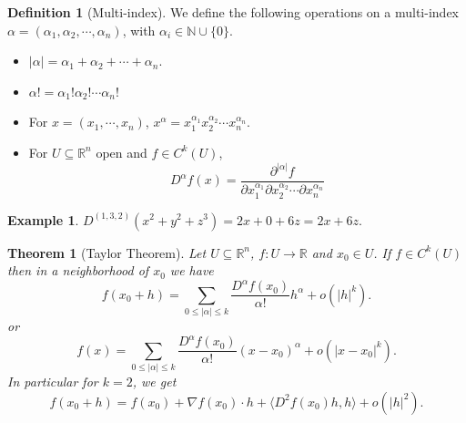 \documentclass[11pt,openany]{book}
\theoremstyle{plain}
\newtheorem{theorem}{Theorem}[chapter]
\theoremstyle{definition}
\newtheorem{definition}{Definition}[chapter]
\newtheorem{example}{Example}[chapter]
\theoremstyle{remark}
\newcommand{\R}{\mathbb{R}}
\begin{document}
\begin{definition}[Multi-index]
We define the following operations on a multi-index $\alpha=(\alpha_1,\alpha_2,\cdots, \alpha_n)$, with $\alpha_i\in \mathbb N\cup \{0\}.$
\begin{itemize}
    \item $|\alpha|=\alpha_1+\alpha_2+\cdots+\alpha_n$.
    \item $\alpha!=\alpha_1!\alpha_2!\cdots \alpha_n!$
    \item For $x=(x_1,\cdots,x_n)$, $x^\alpha=x_1^{\alpha_1}x_2^{\alpha_2}\cdots x_n^{\alpha_n}$.
    \item For $U\subseteq \mathbb R^n$ open and $f\in C^k(U)$,
    $$D^{\alpha} f(x)=\dfrac{\partial^{|\alpha|}f}{\partial x_1^{\alpha_1}\partial x_2^{\alpha_2}\cdots\partial x_n^{\alpha_n}}$$
\end{itemize}

\end{definition}

\begin{example}
$D^{(1,3,2)}(x^2+y^2+z^3)=2x+0+6z=2x+6z.$
\end{example}

\begin{theorem}[Taylor Theorem]
    Let $U \subseteq \R^n$, $f: U \to \R$ and $x_0 \in U$. If $f \in C^k(U)$ then in a neighborhood of $x_0$ we have
    \[f(x_0+h) = \sum_{0 \le |\alpha|\le k} \frac{D^{\alpha}f(x_0)}{\alpha!}h^{\alpha} + o(|h|^k).\] or \[f(x) = \sum_{0 \le |\alpha|\le k}\frac{D^\alpha f(x_0)}{\alpha!}(x-x_0)^\alpha + o(|x-x_0|^k).\]
    In particular for $k=2$, we get
    $$f(x_0+h)=f(x_0)+\nabla f(x_0)\cdot h+\langle D^2f(x_0)h,h\rangle+o(|h|^2).$$
\end{theorem}
\end{document}

